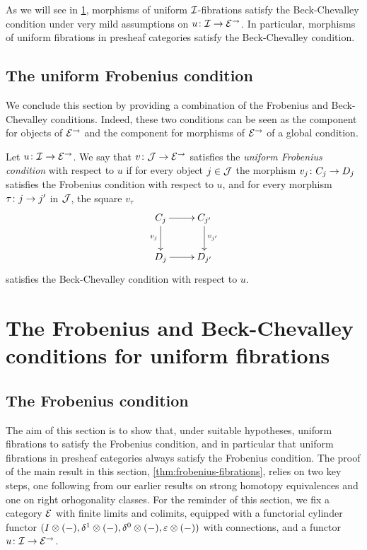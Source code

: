 \documentclass[reqno,10pt,a4paper,oneside,draft]{amsart}
\begin{document}
As we will see in \cref{sec:frocuf}, morphisms of uniform $\cal{I}$-fibrations satisfy the Beck-Chevalley condition under very mild assumptions on $u \co \cal{I} \to \catE^\to$.
In particular, morphisms of uniform fibrations in presheaf categories satisfy the Beck-Chevalley condition.

\subsection*{The uniform Frobenius condition}

We conclude this section by providing a combination of the Frobenius and Beck-Chevalley conditions.
Indeed, these two conditions can be seen as the component for objects of $\catE^\to$ and the component for morphisms of $\catE^\to$ of a global condition.

\begin{definition}
Let $u \co \cal{I} \to \catE^\to$.
We say that $v \co \cal{J} \to \catE^\to$ satisfies the \emph{uniform Frobenius condition} with respect to $u$ if for every object $j \in \cal{J}$ the morphism $v_j \co C_j \to D_j$ satisfies the Frobenius condition with respect to $u$, and for every morphism $\tau \co j \to j'$ in $\cal{J}$, the square $v_\tau$
\[
\xymatrix{
C_j \ar[r] \ar[d]_{v_j} & C_{j'} \ar[d]^{v_{j'}} \\
D_j \ar[r] & D_{j'}}
\]
satisfies the Beck-Chevalley condition with respect to $u$.
\end{definition}



\section{The Frobenius and Beck-Chevalley conditions for uniform fibrations}
\label{sec:frocuf}

\subsection*{The Frobenius condition}

The aim of this section is to show that, under suitable hypotheses, uniform fibrations to satisfy the Frobenius condition, and in particular that uniform fibrations in presheaf categories always satisfy the Frobenius condition.
The proof of the main result in this section, \cref{thm:frobenius-fibrations}, relies on two key steps, one following from our earlier results on strong homotopy equivalences and one on right orhogonality classes.
For the reminder of this section, we fix a category $\catE$ with finite limits and colimits, equipped with a functorial cylinder functor $(\interval \otimes (-), \rcyl \otimes (-), \lcyl \otimes (-), \ccyl \otimes (-))$ with connections, and a functor $u \co \cal{I} \to \catE^\to$.
\end{document}

